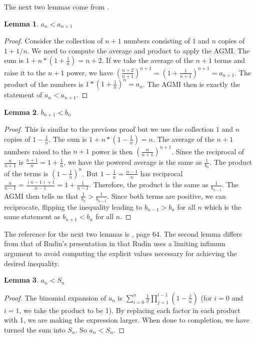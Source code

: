 \documentclass[12pt]{article}
\newtheorem{lemma}{Lemma}[subsection]
\theoremstyle{remark}
\begin{document}
The next two lemmas come from \cite{mend}.

\begin{lemma}
  $ a_n < a_{n+1}$ 
\end{lemma}

\begin{proof}
Consider the collection of $n+1$ numbers consisting of $1$ and $n$ copies of $1+1/n$. We need to compute the average and product to apply the AGMI. The sum is $1 + n* (1 + \frac{1}{n} ) = n+2$. If we take the average of the $n+1$ terms and raise it to the $n+1$ power, we have $(\frac{n+2}{n+1})^{n+1} = (1 + \frac{1}{n+1})^{n+1} = a_{n+1}$. The product of the numbers is $1*(1+\frac{1}{n})^n = a_n$. The AGMI then is exactly the statement of $a_n < a_{n+1}$.
\end{proof}

\begin{lemma}
 $b_{n+1} < b_n$
\end{lemma}

\begin{proof}
This is similar to the previous proof but we use the collection $1$ and $n$ copies of $1 - \frac{1}{n}$. The sum is $1 + n*(1-\frac{1}{n}) = n$. The average of the $n+1$ numbers raised to the $n+1$ power is then $(\frac{n}{n+1})^{n+1}$. Since the reciprocal of $\frac{n}{n+1}$ is $\frac{n+1}{n} = 1+\frac{1}{n}$, we have the powered average is the same as $\frac{1}{b_n}$. The product of the terms is $(1-\frac{1}{n})^n$. But $1 - \frac{1}{n} = \frac{n-1}{n}$ has reciprocal $\frac{n}{n-1} = \frac{ (n-1) + 1}{n-1} = 1 + \frac{1}{n-1}$. Therefore, the product is the same as $\frac{1}{b_{n-1}}$. The AGMI then tells us that $\frac{1}{b_n} > \frac{1}{b_{n-1}}$. Since both terms are positive, we can reciprocate, flipping the inequality leading to $b_{n-1} > b_n$ for all $n$ which is the same statement as $b_{n+1} < b_n$ for all $n$. 
\end{proof}

The reference for the next two lemmas is \cite{rudin}, page 64. The second lemma differs from that of Rudin's presentation in that Rudin uses a limiting infimum argument to avoid computing the explicit values necessary for achieving the desired inequality. 

\begin{lemma}\label{lem:ansn}
$a_n < S_n$
\end{lemma}

\begin{proof}
The binomial expansion of $a_n$ is $\sum_{i=0}^n \frac{1}{i!} \prod_{j=1}^{i-1} (1-\tfrac{j}{n})$ (for $i=0$ and $i=1$, we take the product to be 1). By replacing each factor in each product with 1, we are making the expression larger. When done to completion, we have turned the sum into $S_n$. So $a_n < S_n$.
\end{proof}
\end{document}
